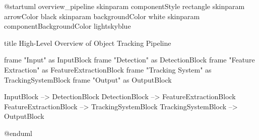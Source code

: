 \documentclass{scrartcl}
\begin{document}
\begin{plantuml}
@startuml overview_pipeline
skinparam componentStyle rectangle
skinparam arrowColor black
skinparam backgroundColor white
skinparam componentBackgroundColor lightskyblue

title High-Level Overview of Object Tracking Pipeline

frame "Input" as InputBlock
frame "Detection" as DetectionBlock
frame "Feature Extraction" as FeatureExtractionBlock
frame "Tracking System" as TrackingSystemBlock
frame "Output" as OutputBlock

InputBlock --> DetectionBlock
DetectionBlock --> FeatureExtractionBlock
FeatureExtractionBlock --> TrackingSystemBlock
TrackingSystemBlock --> OutputBlock

@enduml
\end{plantuml}
\end{document}
